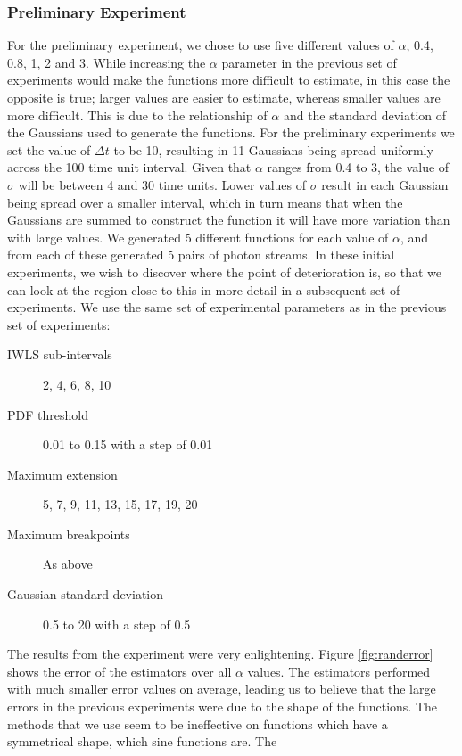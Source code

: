 \documentclass[a4paper,11pt]{article}
\begin{document}
\subsubsection{Preliminary Experiment}
\label{sec-7-2-1}

For the preliminary experiment, we chose to use five different values of
$\alpha$, 0.4, 0.8, 1, 2 and 3. While increasing the $\alpha$ parameter in the
previous set of experiments would make the functions more difficult to estimate,
in this case the opposite is true; larger values are easier to estimate, whereas
smaller values are more difficult. This is due to the relationship of $\alpha$
and the standard deviation of the Gaussians used to generate the functions. For
the preliminary experiments we set the value of $\Delta t$ to be 10, resulting
in 11 Gaussians being spread uniformly across the 100 time unit interval. Given
that $\alpha$ ranges from 0.4 to 3, the value of $\sigma$ will be between 4 and
30 time units. Lower values of $\sigma$ result in each Gaussian being spread
over a smaller interval, which in turn means that when the Gaussians are summed
to construct the function it will have more variation than with large values. We
generated 5 different functions for each value of $\alpha$, and from each of
these generated 5 pairs of photon streams. In these initial experiments, we wish
to discover where the point of deterioration is, so that we can look at the
region close to this in more detail in a subsequent set of experiments. We use
the same set of experimental parameters as in the previous set of experiments:
\begin{description}
\item[IWLS sub-intervals] 2, 4, 6, 8, 10
\item[PDF threshold] 0.01 to 0.15 with a step of 0.01
\item[Maximum extension] 5, 7, 9, 11, 13, 15, 17, 19, 20
\item[Maximum breakpoints] As above
\item[Gaussian standard deviation] 0.5 to 20 with a step of 0.5
\end{description}
The results from the experiment were very enlightening. Figure
\ref{fig:randerror} shows the error of the estimators over all $\alpha$
values. The estimators performed with much smaller error values on average,
leading us to believe that the large errors in the previous experiments were due
to the shape of the functions. The methods that we use seem to be ineffective on
functions which have a symmetrical shape, which sine functions are. The
\end{document}
